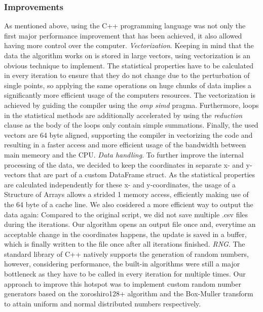 \documentclass[sigconf]{acmart}
\begin{document}
\subsubsection{Improvements}
\label{sub:sec:improvements}
As mentioned above, using the C++ programming language was not only the first major performance improvement that has been achieved, it also allowed having more control over the computer.\newline
\textit{Vectorization}. Keeping in mind that the data the algorithm works on is stored in large vectors, using vectorization is an obvious technique to implement. The statistical properties have to be calculated in every iteration to ensure that they do not change due to the perturbation of single points, so applying the same operations on huge chunks of data implies a significantly more efficient usage of the computers resources. The vectorization is achieved by guiding the compiler using the \textit{omp simd} pragma. Furthermore, loops in the statistical methods are additionally accelerated by using the \textit{reduction} clause as the body of the loops only contain simple summations. Finally, the used vectors are 64 byte aligned, supporting the compiler in vectorizing the code and resulting in a faster access and more efficient usage of the bandwidth between main memeory and the CPU.\newline
\textit{Data handling}. To further improve the internal processing of the data, we decided to keep the coordinates in separate x- and y-vectors that are part of a custom DataFrame struct. As the statistical properties are calculated independently for these x- and y-coordinates, the usage of a Structure of Arrays allows a strided 1 memory access, efficiently making use of the 64 byte of a cache line.\newline
We also cosidered a more efficient way to output the data again: Compared to the original script, we did not save multiple .csv files during the iterations. Our algorithm opens an output file once and, everytime an acceptable change in the coordinates happens, the update is saved in a buffer, which is finally written to the file once after all iterations finished.\newline
\textit{RNG}. The standard library of C++ natively supports the generation of random numbers, however, considering performance, the built-in algorithms were still a major bottleneck as they have to be called in every iteration for multiple times. Our approach to improve this hotspot was to implement custom random number generators based on the xoroshiro128+ algorithm\cite{blackman2021scrambled} and the Box-Muller transform to attain uniform and normal distributed numbers respectively.\newline
\end{document}
